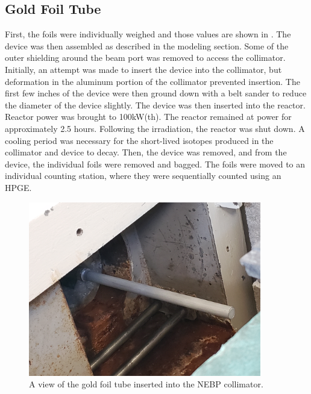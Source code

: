 \subsection{Gold Foil Tube}

First, the foils were individually weighed and those values are shown in .
The device was then assembled as described in the modeling section.
Some of the outer shielding around the beam port was removed to access the collimator.
Initially, an attempt was made to insert the device into the collimator, but deformation in the aluminum portion of the collimator prevented insertion.
The first few inches of the device were then ground down with a belt sander to reduce the diameter of the device slightly.
The device was then inserted into the reactor.
Reactor power was brought to 100kW(th).
The reactor remained at power for approximately 2.5 hours.
Following the irradiation, the reactor was shut down.
A cooling period was necessary for the short-lived isotopes produced in the collimator and device to decay.
Then, the device was removed, and from the device, the individual foils were removed and bagged.
The foils were moved to an individual counting station, where they were sequentially counted using an HPGE.

\begin{figure}[htb]
\centering
\includegraphics[height=3in]{tex/figures/ft_au_in_beam.jpg}
\caption[Gold Foil Tube Experiment]{A view of the gold foil tube inserted into the NEBP collimator.}
\label{fig:ft_au_in_beam}
\end{figure}

